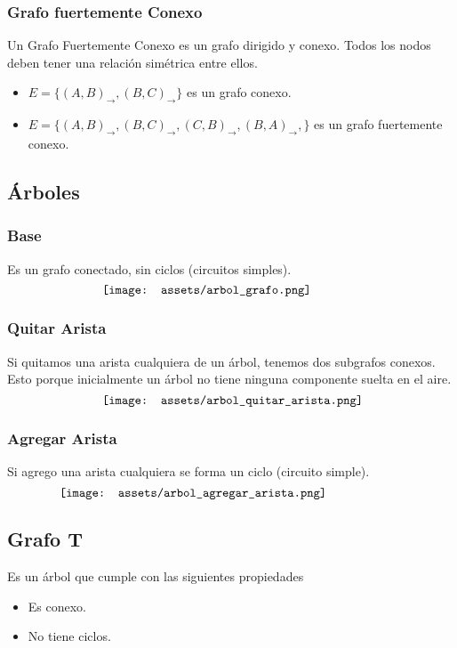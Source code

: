 \documentclass[10pt,a4paper]{article}
\begin{document}
\subsubsection*{Grafo fuertemente Conexo}
Un Grafo Fuertemente Conexo es un grafo dirigido y conexo. Todos los nodos deben tener una relación simétrica entre ellos.
\begin{itemize}
    \item $E = \{(A,B)_{\rightarrow}, (B, C)_{\rightarrow}\}$ es un grafo conexo.
    \item $E = \{(A, B)_{\rightarrow}, (B, C)_{\rightarrow}, (C, B)_{\rightarrow}, (B, A)_{\rightarrow},\}$ es un grafo fuertemente conexo.
\end{itemize}
\subsection*{Árboles}
\subsubsection*{Base}
Es un grafo conectado, sin ciclos (circuitos simples).
\[\begin{minipage}[b]{0.6\textwidth}
    \texttt{[image: assets/arbol\_grafo.png]}
\end{minipage}\]
\subsubsection*{Quitar Arista}
Si quitamos una arista cualquiera de un árbol, tenemos dos subgrafos conexos. Esto porque inicialmente un árbol no tiene ninguna componente suelta en el aire. 
\[\begin{minipage}[b]{0.6\textwidth}
    \texttt{[image: assets/arbol\_quitar\_arista.png]}
\end{minipage}\]
\subsubsection*{Agregar Arista}
Si agrego una arista cualquiera se forma un ciclo (circuito simple).
\[\begin{minipage}[b]{0.8\textwidth}
    \texttt{[image: assets/arbol\_agregar\_arista.png]}
\end{minipage}\]
\subsection*{Grafo T}
Es un árbol que cumple con las siguientes propiedades
\begin{itemize}
    \item Es conexo.
    \item No tiene ciclos. 
\end{itemize}
\end{document}
